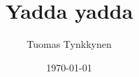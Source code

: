 \documentclass[english]{tktltiki2/tktltiki2}
\title{Yadda yadda}
\author{Tuomas Tynkkynen}
\date{\today}
\theoremstyle{definition}
\theoremstyle{remark}
\begin{document}


\frontmatter      %
\maketitle        %
\makeabstract     %

\tableofcontents  %


\mainmatter


%
%
% 
%

% 
% 



\end{document}

